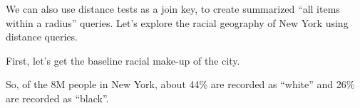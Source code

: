 \documentclass[a4paper,11pt,english]{sphinxmanual}
\begin{document}
We can also use distance tests as a join key, to create summarized “all items within a radius” queries. Let’s explore the racial geography of New York using distance queries.

First, let’s get the baseline racial make-up of the city.

\begin{sphinxVerbatim}[commandchars=\\\{\}]
        
        
    
 
\end{sphinxVerbatim}

\begin{sphinxVerbatim}[commandchars=\\\{\}]
                   
        
\end{sphinxVerbatim}

So, of the 8M people in New York, about 44\% are recorded as “white” and 26\% are recorded as “black”.
\end{document}
